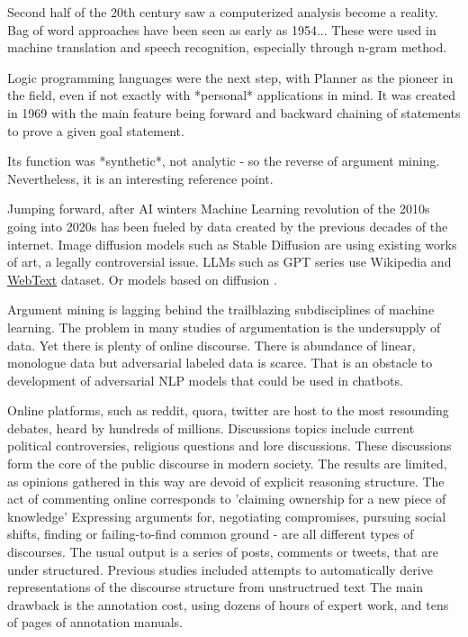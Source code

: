 \documentclass{report}
\begin{document}
{Second half of the 20th century saw a computerized analysis become a reality. Bag of word approaches have been seen as early as 1954... \cite{harris_distributional_1954}
These were used in machine translation and speech recognition, especially through n-gram method. \cite{r_costa-jussa_analysis_2007}

Logic programming languages were the next step, with Planner \cite{hewitt_planner_1970} as the pioneer in the field, even if not exactly with *personal* applications in mind.  It was created in 1969 with the main feature being forward and backward chaining of statements to prove a given goal statement.

Its function was *synthetic*, not analytic - so the reverse of argument mining. Nevertheless, it is an interesting reference point.

Jumping forward, after AI winters Machine Learning revolution of the 2010s going into 2020s has been fueled by data created by the previous decades of the internet. Image diffusion models such as Stable Diffusion are using existing works of art, a legally controversial issue. LLMs such as GPT series use Wikipedia and \href{https:\\paperswithcode.com/dataset/webtext}{WebText} dataset.
Or models based on diffusion \cite{rombach_high-resolution_2022}.

Argument mining is lagging behind the trailblazing subdisciplines of machine learning. The problem in many studies of argumentation is the undersupply of data. Yet there is plenty of online discourse.
There is abundance of linear, monologue data but adversarial labeled data is scarce. That is an obstacle to development of adversarial NLP models that could be used in chatbots. 

Online platforms, such as reddit, quora, twitter are host to the most resounding debates, heard by hundreds of millions.  Discussions topics include current political controversies, religious questions and lore discussions. These discussions form the core of the public discourse in modern society.  The results are limited, as opinions gathered in this way are devoid of explicit reasoning structure.  The act of commenting online corresponds to 'claiming ownership for a new piece of knowledge' \cite{teufel_scientific_2014} Expressing arguments for, negotiating compromises, pursuing social shifts, finding or failing-to-find common ground - are all different types of discourses. The usual output is a series of posts, comments or tweets, that are under structured. 
Previous studies included attempts to automatically derive representations of the discourse structure from unstructrued text \cite{abbott_how_2011}
The main drawback is the annotation cost, using dozens of hours of expert work, and tens of pages of annotation manuals.

}
\end{document}

